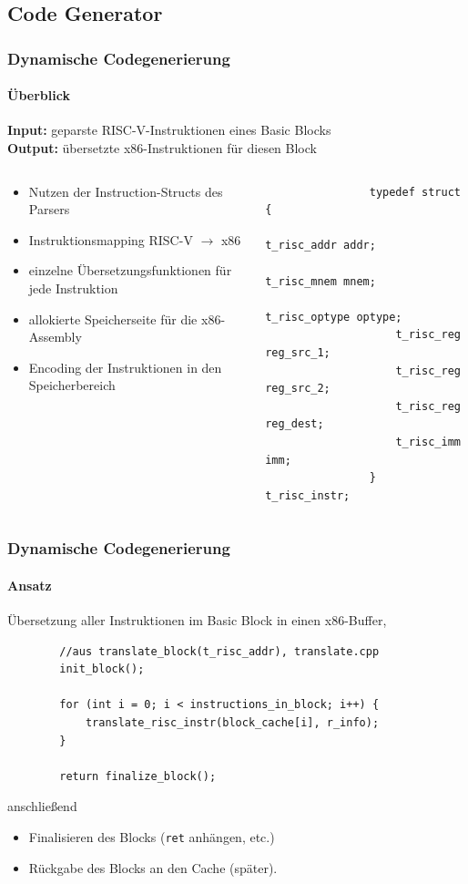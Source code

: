 \documentclass[german]{tum-presentation}
\newcommand{\refer}[0]{\ensuremath{\rightarrow} }
\begin{document}
\subsection{Code Generator} %
\begin{frame}[fragile]
	\frametitle{Dynamische Codegenerierung}
	\framesubtitle{Überblick}

	\textbf{Input:} geparste RISC-V-Instruktionen eines Basic Blocks\\
	\textbf{Output:} übersetzte x86-Instruktionen für diesen Block

	\pause
	\begin{columns}
		\begin{column}{0.5\textwidth}
			\vspace{0.25cm}
			\begin{itemize}
				\item Nutzen der Instruction-Structs des Parsers
				\item Instruktionsmapping RISC-V \refer x86
				\item einzelne Übersetzungsfunktionen für jede Instruktion
				
				\vspace{1cm}
				
				\item allokierte Speicherseite für die x86-Assembly
				\item Encoding der Instruktionen in den Speicherbereich
			\end{itemize}
		\end{column}
		
		\begin{column}{0.5\textwidth}
			\begin{lstlisting}
				typedef struct {
				    t_risc_addr addr;
				    t_risc_mnem mnem;
				    t_risc_optype optype;
				    t_risc_reg reg_src_1;
				    t_risc_reg reg_src_2;
				    t_risc_reg reg_dest;
				    t_risc_imm imm;
				} t_risc_instr;
			\end{lstlisting}
		\end{column}
	\end{columns}
\end{frame}

\begin{frame}[fragile]
	\frametitle{Dynamische Codegenerierung}
	\framesubtitle{Ansatz}
	
	Übersetzung aller Instruktionen im Basic Block in einen x86-Buffer,
	\begin{lstlisting}
		//aus translate_block(t_risc_addr), translate.cpp
		init_block();
		
		for (int i = 0; i < instructions_in_block; i++) {
			translate_risc_instr(block_cache[i], r_info);
    	}
    	
		return finalize_block();
	\end{lstlisting}
	
	anschließend
	\begin{itemize}
		\item Finalisieren des Blocks (\verb!ret! anhängen, etc.)
		\item Rückgabe des Blocks an den Cache (später).
	\end{itemize}
\end{frame}
\end{document}
